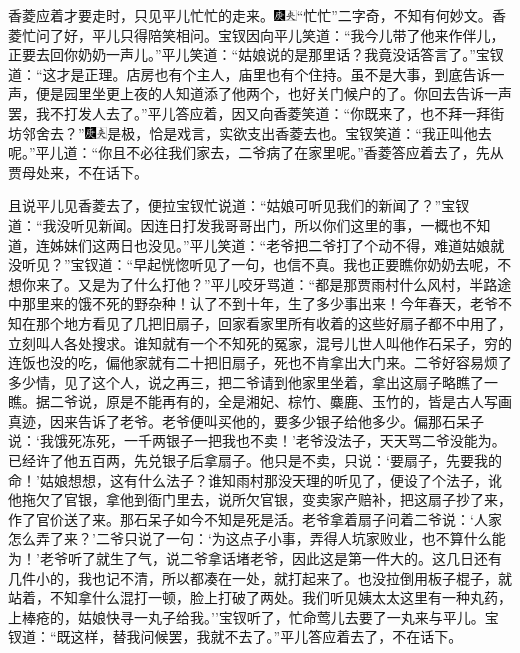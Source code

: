 香菱应着才要走时，只见平儿忙忙的走来。{\includegraphics[width=3mm]{../Images/00004}\includegraphics[width=3mm]{../Images/00012}\footnotesize \kaishu ``忙忙''二字奇，不知有何妙文。}香菱忙问了好，平儿只得陪笑相问。宝钗因向平儿笑道：``我今儿带了他来作伴儿，正要去回你奶奶一声儿。''平儿笑道：``姑娘说的是那里话？我竟没话答言了。''宝钗道：``这才是正理。店房也有个主人，庙里也有个住持。虽不是大事，到底告诉一声，便是园里坐更上夜的人知道添了他两个，也好关门候户的了。你回去告诉一声罢，我不打发人去了。''平儿答应着，因又向香菱笑道：``你既来了，也不拜一拜街坊邻舍去？''{\includegraphics[width=3mm]{../Images/00004}\includegraphics[width=3mm]{../Images/00012}\footnotesize \kaishu 是极，恰是戏言，实欲支出香菱去也。}宝钗笑道：``我正叫他去呢。''平儿道：``你且不必往我们家去，二爷病了在家里呢。''香菱答应着去了，先从贾母处来，不在话下。

且说平儿见香菱去了，便拉宝钗忙说道：``姑娘可听见我们的新闻了？''宝钗道：``我没听见新闻。因连日打发我哥哥出门，所以你们这里的事，一概也不知道，连姊妹们这两日也没见。''平儿笑道：``老爷把二爷打了个动不得，难道姑娘就没听见？''宝钗道：``早起恍惚听见了一句，也信不真。我也正要瞧你奶奶去呢，不想你来了。又是为了什么打他？''平儿咬牙骂道：``都是那贾雨村什么风村，半路途中那里来的饿不死的野杂种！认了不到十年，生了多少事出来！今年春天，老爷不知在那个地方看见了几把旧扇子，回家看家里所有收着的这些好扇子都不中用了，立刻叫人各处搜求。谁知就有一个不知死的冤家，混号儿世人叫他作石呆子，穷的连饭也没的吃，偏他家就有二十把旧扇子，死也不肯拿出大门来。二爷好容易烦了多少情，见了这个人，说之再三，把二爷请到他家里坐着，拿出这扇子略瞧了一瞧。据二爷说，原是不能再有的，全是湘妃、棕竹、麋鹿、玉竹的，皆是古人写画真迹，因来告诉了老爷。老爷便叫买他的，要多少银子给他多少。偏那石呆子说：`我饿死冻死，一千两银子一把我也不卖！'老爷没法子，天天骂二爷没能为。已经许了他五百两，先兑银子后拿扇子。他只是不卖，只说：`要扇子，先要我的命！'姑娘想想，这有什么法子？谁知雨村那没天理的听见了，便设了个法子，讹他拖欠了官银，拿他到衙门里去，说所欠官银，变卖家产赔补，把这扇子抄了来，作了官价送了来。那石呆子如今不知是死是活。老爷拿着扇子问着二爷说：`人家怎么弄了来？'二爷只说了一句：`为这点子小事，弄得人坑家败业，也不算什么能为！'老爷听了就生了气，说二爷拿话堵老爷，因此这是第一件大的。这几日还有几件小的，我也记不清，所以都凑在一处，就打起来了。也没拉倒用板子棍子，就站着，不知拿什么混打一顿，脸上打破了两处。我们听见姨太太这里有一种丸药，上棒疮的，姑娘快寻一丸子给我。''宝钗听了，忙命莺儿去要了一丸来与平儿。宝钗道：``既这样，替我问候罢，我就不去了。''平儿答应着去了，不在话下。

